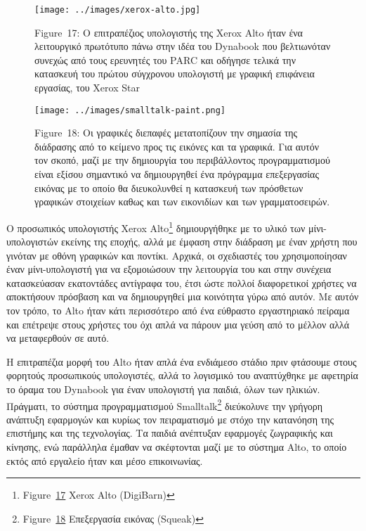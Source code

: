 \documentclass[
]{article}
\begin{document}
\leavevmode{}%
\begin{figure}
\hypertarget{fig:xerox-alto}{%
\centering
\texttt{[image: ../images/xerox-alto.jpg]}
\caption{Figure~17: Ο επιτραπέζιος υπολογιστής της Xerox Alto ήταν ένα
λειτουργικό πρωτότυπο πάνω στην ιδέα του Dynabook που βελτιωνόταν
συνεχώς από τους ερευνητές του PARC και οδήγησε τελικά την κατασκευή του
πρώτου σύγχρονου υπολογιστή με γραφική επιφάνεια εργασίας, του Xerox
Star}\label{fig:xerox-alto}
}
\end{figure}

\leavevmode{}%
\begin{figure}
\hypertarget{fig:smalltalk-paint}{%
\centering
\texttt{[image: ../images/smalltalk-paint.png]}
\caption{Figure~18: Οι γραφικές διεπαφές μετατοπίζουν την σημασία της
διάδρασης από το κείμενο προς τις εικόνες και τα γραφικά. Για αυτόν τον
σκοπό, μαζί με την δημιουργία του περιβάλλοντος προγραμματισμού είναι
εξίσου σημαντικό να δημιουργηθεί ένα πρόγραμμα επεξεργασίας εικόνας με
το οποίο θα διευκολυνθεί η κατασκευή των πρόσθετων γραφικών στοιχείων
καθως και των εικονιδίων και των
γραμματοσειρών.}\label{fig:smalltalk-paint}
}
\end{figure}

Ο προσωπικός υπολογιστής Xerox Alto\footnote{Figure~\protect\hyperlink{fig:xerox-alto}{17}
  Xerox Alto (DigiBarn)} δημιουργήθηκε με το υλικό των μίνι-υπολογιστών
εκείνης της εποχής, αλλά με έμφαση στην διάδραση με έναν χρήστη που
γινόταν με οθόνη γραφικών και ποντίκι. Αρχικά, οι σχεδιαστές του
χρησιμοποίησαν έναν μίνι-υπολογιστή για να εξομοιώσουν την λειτουργία
του και στην συνέχεια κατασκεύασαν εκατοντάδες αντίγραφα του, έτσι ώστε
πολλοί διαφορετικοί χρήστες να αποκτήσουν πρόσβαση και να δημιουργηθεί
μια κοινότητα γύρω από αυτόν. Με αυτόν τον τρόπο, το Alto ήταν κάτι
περισσότερο από ένα εύθραστο εργαστηριακό πείραμα και επέτρεψε στους
χρήστες του όχι απλά να πάρουν μια γεύση από το μέλλον αλλά να
μεταφερθούν σε αυτό.

Η επιτραπέζια μορφή του Alto ήταν απλά ένα ενδιάμεσο στάδιο πριν
φτάσουμε στους φορητούς προσωπικούς υπολογιστές, αλλά το λογισμικό του
αναπτύχθηκε με αφετηρία το όραμα του Dynabook για έναν υπολογιστή για
παιδιά, όλων των ηλικιών. Πράγματι, το σύστημα προγραμματισμού
Smalltalk\footnote{Figure~\protect\hyperlink{fig:smalltalk-paint}{18}
  Eπεξεργασία εικόνας (Squeak)} διεύκολυνε την γρήγορη ανάπτυξη
εφαρμογών και κυρίως τον πειραματισμό με στόχο την κατανόηση της
επιστήμης και της τεχνολογίας. Τα παιδιά ανέπτυξαν εφαρμογές ζωγραφικής
και κίνησης, ενώ παράλληλα έμαθαν να σκέφτονται μαζί με το σύστημα Alto,
το οποίο εκτός από εργαλείο ήταν και μέσο επικοινωνίας.
\end{document}
